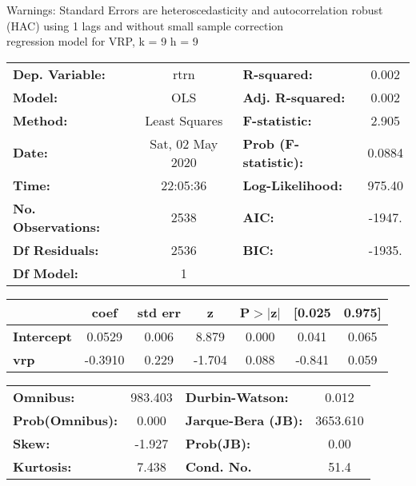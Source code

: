 Warnings: \newline
 [1] Standard Errors are heteroscedasticity and autocorrelation robust (HAC) using 1 lags and without small sample correction\\ 

regression model for VRP, k = 9 h = 9\begin{center}
\begin{tabular}{lclc}
\toprule
\textbf{Dep. Variable:}    &       rtrn       & \textbf{  R-squared:         } &     0.002   \\
\textbf{Model:}            &       OLS        & \textbf{  Adj. R-squared:    } &     0.002   \\
\textbf{Method:}           &  Least Squares   & \textbf{  F-statistic:       } &     2.905   \\
\textbf{Date:}             & Sat, 02 May 2020 & \textbf{  Prob (F-statistic):} &   0.0884    \\
\textbf{Time:}             &     22:05:36     & \textbf{  Log-Likelihood:    } &    975.40   \\
\textbf{No. Observations:} &        2538      & \textbf{  AIC:               } &    -1947.   \\
\textbf{Df Residuals:}     &        2536      & \textbf{  BIC:               } &    -1935.   \\
\textbf{Df Model:}         &           1      & \textbf{                     } &             \\
\bottomrule
\end{tabular}
\begin{tabular}{lcccccc}
                   & \textbf{coef} & \textbf{std err} & \textbf{z} & \textbf{P$> |$z$|$} & \textbf{[0.025} & \textbf{0.975]}  \\
\midrule
\textbf{Intercept} &       0.0529  &        0.006     &     8.879  &         0.000        &        0.041    &        0.065     \\
\textbf{vrp}       &      -0.3910  &        0.229     &    -1.704  &         0.088        &       -0.841    &        0.059     \\
\bottomrule
\end{tabular}
\begin{tabular}{lclc}
\textbf{Omnibus:}       & 983.403 & \textbf{  Durbin-Watson:     } &    0.012  \\
\textbf{Prob(Omnibus):} &   0.000 & \textbf{  Jarque-Bera (JB):  } & 3653.610  \\
\textbf{Skew:}          &  -1.927 & \textbf{  Prob(JB):          } &     0.00  \\
\textbf{Kurtosis:}      &   7.438 & \textbf{  Cond. No.          } &     51.4  \\
\bottomrule
\end{tabular}
\end{center}

